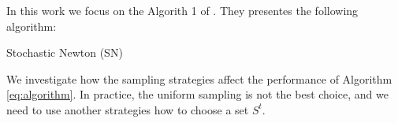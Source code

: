 \documentclass{article}
\begin{document}
In this work we focus on the Algorith 1 of  \cite{litlink4}. They presentes the following algorithm:

\begin{algorithm}\label{eq:algorithm}
\caption{Stochastic Newton (SN)}\label{alg:cap}
\begin{algorithmic}
\EndFor
\end{algorithmic}
\end{algorithm}





We investigate how the sampling strategies affect the performance of Algorithm \eqref{eq:algorithm}. In practice, the uniform sampling is not the best choice, and we need to use another strategies how to choose a set $S^t$. 
\end{document}
